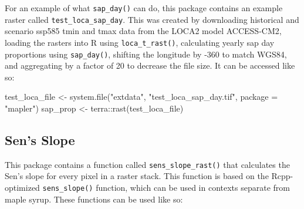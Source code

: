 \documentclass[
]{article}
\newenvironment{Shaded}{}{}
\newcommand{\AttributeTok}[1]{\textcolor[rgb]{0.49,0.56,0.16}{#1}}
\newcommand{\FunctionTok}[1]{\textcolor[rgb]{0.02,0.16,0.49}{#1}}
\newcommand{\NormalTok}[1]{#1}
\newcommand{\OtherTok}[1]{\textcolor[rgb]{0.00,0.44,0.13}{#1}}
\newcommand{\SpecialCharTok}[1]{\textcolor[rgb]{0.25,0.44,0.63}{#1}}
\newcommand{\StringTok}[1]{\textcolor[rgb]{0.25,0.44,0.63}{#1}}
\begin{document}
For an example of what \texttt{sap\_day()} can do, this package contains
an example raster called \texttt{test\_loca\_sap\_day}. This was created
by downloading historical and scenario ssp585 tmin and tmax data from
the LOCA2 model ACCESS-CM2, loading the rasters into R using
\texttt{loca\_t\_rast()}, calculating yearly sap day proportions using
\texttt{sap\_day()}, shifting the longitude by -360 to match WGS84, and
aggregating by a factor of 20 to decrease the file size. It can be
accessed like so:

\begin{Shaded}
\begin{Highlighting}[]
\NormalTok{test\_loca\_file }\OtherTok{\textless{}{-}} \FunctionTok{system.file}\NormalTok{(}\StringTok{"extdata"}\NormalTok{, }\StringTok{"test\_loca\_sap\_day.tif"}\NormalTok{,}
                                \AttributeTok{package =} \StringTok{"mapler"}\NormalTok{)}
\NormalTok{sap\_prop }\OtherTok{\textless{}{-}}\NormalTok{ terra}\SpecialCharTok{::}\FunctionTok{rast}\NormalTok{(test\_loca\_file)}
\end{Highlighting}
\end{Shaded}

\subsection{Sen's Slope}\label{sens-slope}

This package contains a function called \texttt{sens\_slope\_rast()}
that calculates the Sen's slope for every pixel in a raster stack. This
function is based on the Rcpp-optimized \texttt{sens\_slope()} function,
which can be used in contexts separate from maple syrup. These functions
can be used like so:
\end{document}

